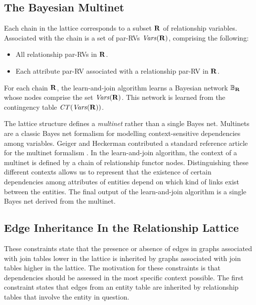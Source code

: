 \subsection{The Bayesian Multinet}

Each chain in the lattice corresponds to a subset $\mathbf{R}$ of relationship variables. Associated with the chain is a set of par-RVs $\it{Vars}(\mathbf{R})$, comprising the following:

\begin{itemize}
\item All relationship par-RVs in $\mathbf{R}$. 
\item Each attribute par-RV associated with a relationship par-RV in $\mathbf{R}$.
\end{itemize}

For each chain $\mathbf{R}$, the learn-and-join algorithm learns a Bayesian network 
$\mathbb{B}_{\mathbf{R}}$ whose nodes comprise the set $\it{Vars}(\mathbf{R})$. This network is learned from the contingency table $\it{CT}(\it{Vars}(\mathbf{R}))$.

The lattice structure defines a {\em multinet} rather than a single Bayes net. Multinets are a classic Bayes net formalism for modelling context-sensitive dependencies among variables. 
Geiger and Heckerman contributed a standard reference article for the multinet formalism  \cite{Geiger1996}.  
%
In the learn-and-join algorithm, the context of a multinet is defined by a chain of relationship functor nodes. Distinguishing these different contexts allows us to  represent that the existence of certain dependencies among attributes of entities depend on which kind of links exist between the entities. The final output of the learn-and-join algorithm is a single Bayes net derived from the multinet.

\subsection{Edge Inheritance In the Relationship Lattice}
These constraints state that the presence or absence of edges in graphs associated with join tables lower in the lattice is inherited by graphs associated with join tables higher in the lattice. The motivation for these constraints is that dependencies should be assessed in the most specific context possible. The first constraint states that edges from an entity table are inherited by relationship tables that involve the entity in question.

